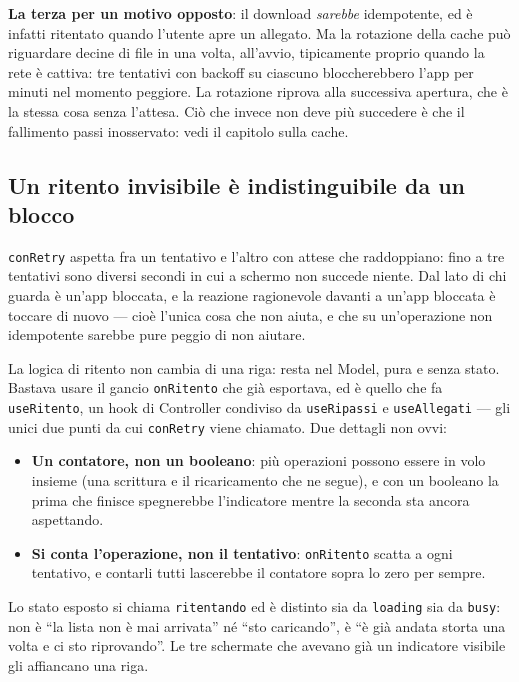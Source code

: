 \documentclass[11pt,a4paper]{report}
\begin{document}
\textbf{La terza per un motivo opposto}: il download \emph{sarebbe}
idempotente, ed \`e infatti ritentato quando l'utente apre un allegato. Ma la
rotazione della cache pu\`o riguardare decine di file in una volta, all'avvio,
tipicamente proprio quando la rete \`e cattiva: tre tentativi con backoff su
ciascuno bloccherebbero l'app per minuti nel momento peggiore. La rotazione
riprova alla successiva apertura, che \`e la stessa cosa senza l'attesa. Ci\`o
che invece non deve pi\`u succedere \`e che il fallimento passi inosservato:
vedi il capitolo sulla cache.

\subsection*{Un ritento invisibile \`e indistinguibile da un blocco}

\texttt{conRetry} aspetta fra un tentativo e l'altro con attese che
raddoppiano: fino a tre tentativi sono diversi secondi in cui a schermo non
succede niente. Dal lato di chi guarda \`e un'app bloccata, e la reazione
ragionevole davanti a un'app bloccata \`e toccare di nuovo --- cio\`e l'unica
cosa che non aiuta, e che su un'operazione non idempotente sarebbe pure peggio
di non aiutare.

La logica di ritento non cambia di una riga: resta nel Model, pura e senza
stato. Bastava usare il gancio \texttt{onRitento} che gi\`a esportava, ed \`e
quello che fa \texttt{useRitento}, un hook di Controller condiviso da
\texttt{useRipassi} e \texttt{useAllegati} --- gli unici due punti da cui
\texttt{conRetry} viene chiamato. Due dettagli non ovvi:

\begin{itemize}[nosep]
  \item \textbf{Un contatore, non un booleano}: pi\`u operazioni possono essere
        in volo insieme (una scrittura e il ricaricamento che ne segue), e con
        un booleano la prima che finisce spegnerebbe l'indicatore mentre la
        seconda sta ancora aspettando.
  \item \textbf{Si conta l'operazione, non il tentativo}: \texttt{onRitento}
        scatta a ogni tentativo, e contarli tutti lascerebbe il contatore sopra
        lo zero per sempre.
\end{itemize}

Lo stato esposto si chiama \texttt{ritentando} ed \`e distinto sia da
\texttt{loading} sia da \texttt{busy}: non \`e ``la lista non \`e mai
arrivata'' n\'e ``sto caricando'', \`e ``\`e gi\`a andata storta una volta e ci
sto riprovando''. Le tre schermate che avevano gi\`a un indicatore visibile gli
affiancano una riga.
\end{document}
